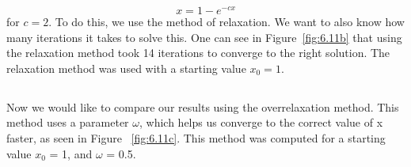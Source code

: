 \documentclass[12pt]{article}
\begin{document}
\begin{equation}
    x = 1 - e^{-cx}
\end{equation}{}
for $c = 2$.
To do this, we use the method of relaxation. We want to also know how many iterations it takes to solve this. One can see in Figure~\ref{fig:6.11b} that using the relaxation method took 14 iterations to converge to the right solution. The relaxation method was used with a starting value $x_0 = 1$.
\renewcommand\thesubsection{c}
\subsection{}
Now we would like to compare our results using the overrelaxation method. This method uses a parameter $\omega$, which helps us converge to the correct value of x faster, as seen in Figure ~\ref{fig:6.11c}. This method was computed for a starting value $x_0$ = 1, and $\omega$ = 0.5.
\end{document}
